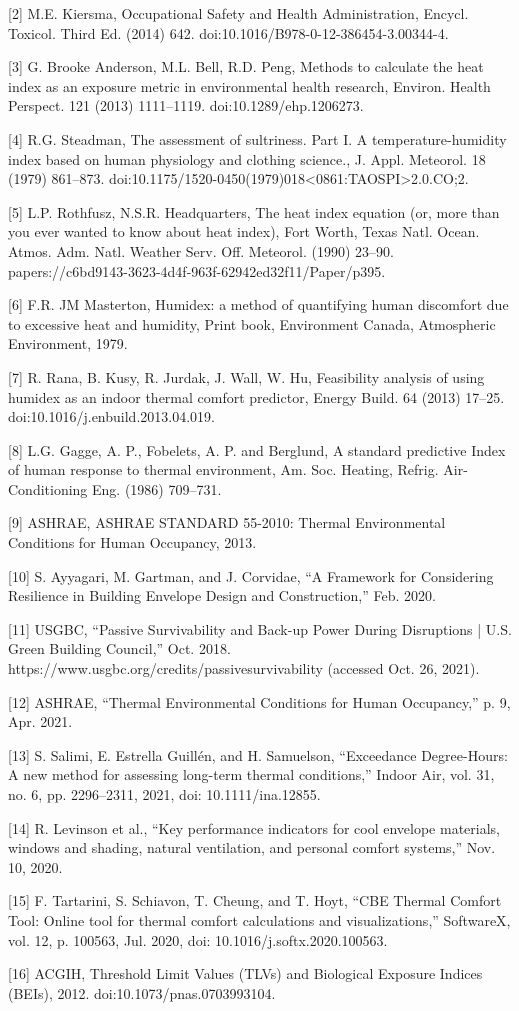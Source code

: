 {[}2{]} M.E. Kiersma, Occupational Safety and Health Administration, Encycl.
Toxicol. Third Ed. (2014) 642. doi:10.1016/B978-0-12-386454-3.00344-4.

{[}3{]} G. Brooke Anderson, M.L. Bell, R.D. Peng, Methods to calculate the heat
index as an exposure metric in environmental health research, Environ. Health
Perspect. 121 (2013) 1111–1119. doi:10.1289/ehp.1206273.

{[}4{]} R.G. Steadman, The assessment of sultriness. Part I. A
temperature-humidity index based on human physiology and clothing science., J.
Appl. Meteorol. 18 (1979) 861–873.
doi:10.1175/1520-0450(1979)018<0861:TAOSPI>2.0.CO;2.

{[}5{]} L.P. Rothfusz, N.S.R. Headquarters, The heat index equation (or, more
than you ever wanted to know about heat index), Fort Worth, Texas Natl. Ocean.
Atmos. Adm. Natl. Weather Serv. Off. Meteorol. (1990) 23–90.
papers://c6bd9143-3623-4d4f-963f-62942ed32f11/Paper/p395.

{[}6{]} F.R. JM Masterton, Humidex: a method of quantifying human discomfort due
to excessive heat and humidity, Print book, Environment Canada, Atmospheric
Environment, 1979.

{[}7{]} R. Rana, B. Kusy, R. Jurdak, J. Wall, W. Hu, Feasibility analysis of
using humidex as an indoor thermal comfort predictor, Energy Build. 64 (2013)
17–25. doi:10.1016/j.enbuild.2013.04.019.

{[}8{]} L.G. Gagge, A. P., Fobelets, A. P. and Berglund, A standard predictive
Index of human response to thermal environment, Am. Soc. Heating, Refrig.
Air-Conditioning Eng. (1986) 709–731.

{[}9{]} ASHRAE, ASHRAE STANDARD 55-2010: Thermal Environmental Conditions for
Human Occupancy, 2013.

{[}10{]} S. Ayyagari, M. Gartman, and J. Corvidae, ``A Framework for Considering
Resilience in Building Envelope Design and Construction,'' Feb. 2020.

{[}11{]} USGBC, ``Passive Survivability and Back-up Power During Disruptions |
U.S. Green Building Council,'' Oct. 2018.
https://www.usgbc.org/credits/passivesurvivability (accessed Oct. 26, 2021).

{[}12{]} ASHRAE, ``Thermal Environmental Conditions for Human Occupancy,'' p. 9,
Apr. 2021.

{[}13{]} S. Salimi, E. Estrella Guillén, and H. Samuelson, ``Exceedance
Degree-Hours: A new method for assessing long-term thermal conditions,'' Indoor
Air, vol. 31, no. 6, pp. 2296–2311, 2021, doi: 10.1111/ina.12855.

{[}14{]} R. Levinson et al., ``Key performance indicators for cool envelope
materials, windows and shading, natural ventilation, and personal comfort
systems,'' Nov. 10, 2020.

{[}15{]} F. Tartarini, S. Schiavon, T. Cheung, and T. Hoyt, ``CBE Thermal
Comfort Tool: Online tool for thermal comfort calculations and visualizations,''
SoftwareX, vol. 12, p. 100563, Jul. 2020, doi: 10.1016/j.softx.2020.100563.

{[}16{]} ACGIH, Threshold Limit Values (TLVs) and Biological Exposure Indices
(BEIs), 2012. doi:10.1073/pnas.0703993104.

